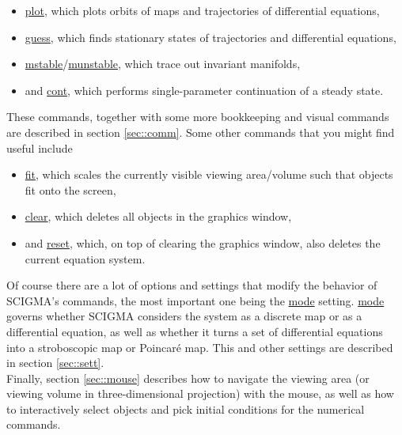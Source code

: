 \documentclass[10pt,a4paper,titlepage]{article}
\newcommand{\HL}[1]{\hyperlink{#1}{#1}}
\begin{document}
\begin{itemize}
\item{\HL{plot}, which plots orbits of maps and trajectories of differential equations,}
\item{\HL{guess}, which finds stationary states of trajectories and differential equations,}
\item{ \HL{mstable}/\HL{munstable}, which trace out invariant manifolds,}
\item{and  \HL{cont}, which performs single-parameter continuation of a steady state.}
\end{itemize}
These commands, together with some more bookkeeping and visual commands are described in section \ref{sec::comm}. Some other commands that you might find useful include
\begin{itemize}
\item{\HL{fit}, which scales the currently visible viewing area/volume such that objects fit onto the screen,}
\item{\HL{clear}, which deletes all objects in the graphics window,}
\item{and \HL{reset}, which, on top of clearing the graphics window, also deletes the current equation system.}
\end{itemize}
Of course there are a lot of options and settings that modify the behavior of SCIGMA's commands, the most important one being the \HL{mode} setting. \HL{mode} governs whether SCIGMA considers the system as a discrete map or as a differential equation, as well as whether it turns a set of differential equations into a stroboscopic map or Poincar\'e map. This and other settings are described in section \ref{sec::sett}.\\
Finally, section \ref{sec::mouse} describes how to navigate the viewing area (or viewing volume in three-dimensional projection) with the mouse, as well as how to interactively select objects and pick initial conditions for the numerical commands.
\end{document}

